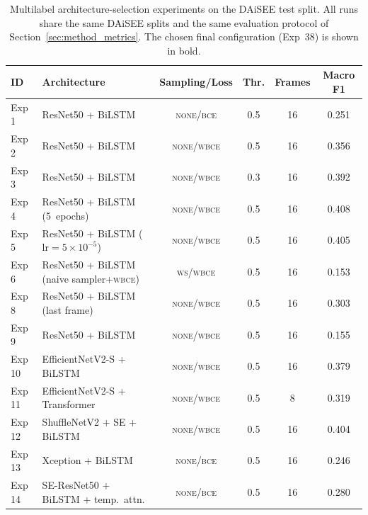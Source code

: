 \begin{table}[H]
\centering
\small
\caption{Multilabel architecture-selection experiments on the DAiSEE test split. All runs share the same DAiSEE splits and the same evaluation protocol of Section~\ref{sec:method_metrics}. The chosen final configuration (Exp~38) is shown in bold.}
\label{tab:fer_arch_selection_multilabel}
\begin{tabular}{lp{4.4cm}cccc}
\toprule
\textbf{ID} & \textbf{Architecture} & \textbf{Sampling/Loss} & \textbf{Thr.} & \textbf{Frames} & \textbf{Macro F1} \\
\midrule
Exp 1  & ResNet50 + BiLSTM                                         & \textsc{none}/\textsc{bce}    & 0.5     & 16 & 0.251 \\
Exp 2  & ResNet50 + BiLSTM                                         & \textsc{none}/\textsc{wbce}   & 0.5     & 16 & 0.356 \\
Exp 3  & ResNet50 + BiLSTM                                         & \textsc{none}/\textsc{wbce}   & 0.3     & 16 & 0.392 \\
Exp 4  & ResNet50 + BiLSTM (5~epochs)                              & \textsc{none}/\textsc{wbce}   & 0.5     & 16 & 0.408 \\
Exp 5  & ResNet50 + BiLSTM ($\mathrm{lr}=5\!\times\!10^{-5}$)      & \textsc{none}/\textsc{wbce}   & 0.5     & 16 & 0.405 \\
Exp 6  & ResNet50 + BiLSTM (naive sampler+\textsc{wbce})           & \textsc{ws}/\textsc{wbce}     & 0.5     & 16 & 0.153 \\
Exp 8  & ResNet50 + BiLSTM (last frame)                            & \textsc{none}/\textsc{wbce}   & 0.5     & 16 & 0.303 \\
Exp 9  & ResNet50 + BiLSTM                                         & \textsc{none}/\textsc{wbce}   & 0.5     & 16 & 0.155 \\
Exp 10 & EfficientNetV2-S + BiLSTM                                 & \textsc{none}/\textsc{wbce}   & 0.5     & 16 & 0.379 \\
Exp 11 & EfficientNetV2-S + Transformer                            & \textsc{none}/\textsc{wbce}   & 0.5     & 8  & 0.319 \\
Exp 12 & ShuffleNetV2 + SE + BiLSTM                                & \textsc{none}/\textsc{wbce}   & 0.5     & 16 & 0.404 \\
Exp 13 & Xception + BiLSTM                                         & \textsc{none}/\textsc{bce}    & 0.5     & 16 & 0.246 \\
Exp 14 & SE-ResNet50 + BiLSTM + temp.\ attn.                       & \textsc{none}/\textsc{bce}    & 0.5     & 16 & 0.280 \\

\end{tabular}
\end{table}
